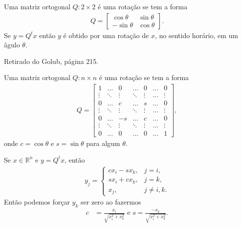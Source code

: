 \begin{questions}
\begin{solution}
        Uma matriz ortogonal $Q : 2 \times 2$ \'{e} uma rota\c{c}\~{a}o se tem a forma
        \begin{align*}
            Q = \begin{bmatrix}
                \cos \theta & \sin \theta \\
                -\sin \theta & \cos \theta
            \end{bmatrix}.
        \end{align*}
        Se $y = Q^t x$ ent\~{a}o $y$ \'{e} obtido por uma rota\c{c}\~{a}o de $x$, no sentido hor\'{a}rio, em um \^{a}gulo $\theta$.

        Retirado do Golub, p\'{a}gina 215.

        Uma matriz ortogonal $Q : n \times n$ \'{e} uma rota\c{c}\~{a}o se tem a forma
        \begin{align*}
            Q = \begin{bmatrix}
                1      & \ldots & 0      & \ldots & 0       & \ldots & 0       \\
                \vdots & \ddots & \vdots & \ddots & \vdots  & \ldots & \vdots  \\
                0      & \ldots & c      & \ldots &  s      & \ldots & 0       \\
                \vdots & \ddots & \vdots & \ddots & \vdots  & \ldots & \vdots  \\
                0      & \ldots & -s     & \ldots &  c      & \ldots & 0       \\
                \vdots & \ddots & \vdots & \ddots & \vdots  & \ldots & \vdots  \\
                0      & \ldots & 0      & \ldots & 0       & \ldots & 1 
            \end{bmatrix},
        \end{align*}
        onde $c = \cos \theta$ e $s = \sin \theta$ para algum $\theta$.

        Se $x \in \mathbb{R}^n$ e $y = Q^t x$, ent\~{a}o
        \begin{align*}
            y_j = \begin{cases}
                c x_i - s x_k, & j = i, \\
                s x_i + c x_k, & j = k, \\
                x_j, & j \neq i, k.
            \end{cases}
        \end{align*}
        Ent\~{a}o podemos for\c{c}ar $y_k$ ser zero ao fazermos
        \begin{align*}
            c &= \frac{x_i}{\sqrt{x_i^2 + x_k^2}} \text{ e } s = \frac{-x_k}{\sqrt{x_i^2 + x_k^2}}.
        \end{align*}
    \end{solution}


\end{questions}
